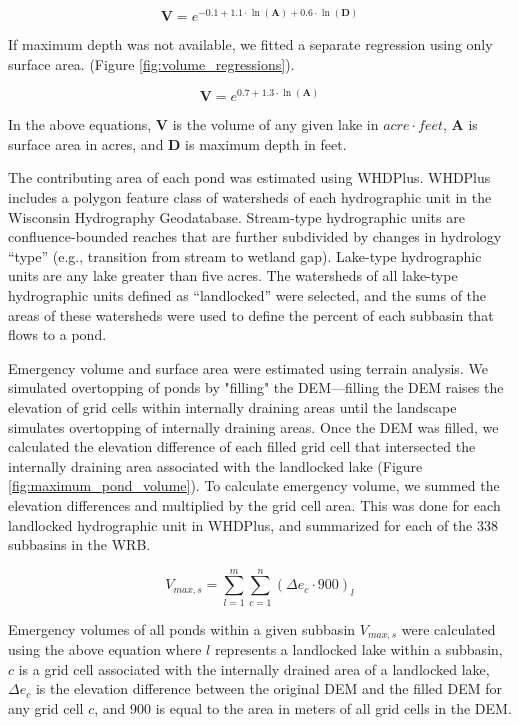 \begin{equation}
\bm{V} = e^{-0.1 + 1.1 \cdot \ln(\bm{A}) + 0.6 \cdot \ln(\bm{D})} 
\end{equation}

If maximum depth was not available, we fitted a separate regression using only surface area. (Figure \ref{fig:volume_regressions}).

\begin{equation}
\bm{V} = e^{0.7 + 1.3 \cdot \ln(\bm{A})} 
\end{equation}

In the above equations, $\bm{V}$ is the volume of any given lake in $acre \cdot feet$, $\bm{A}$ is surface area in acres, and $\bm{D}$ is maximum depth in feet.

The contributing area of each pond was estimated using WHDPlus. WHDPlus includes a polygon feature class of watersheds of each hydrographic unit in the Wisconsin Hydrography Geodatabase. Stream-type hydrographic units are confluence-bounded reaches that are further subdivided by changes in hydrology ``type'' (e.g., transition from stream to wetland gap). Lake-type hydrographic units are any lake greater than five acres. The watersheds of all lake-type hydrographic units defined as ``landlocked'' were selected, and the sums of the areas of these watersheds were used to define the percent of each subbasin that flows to a pond.

Emergency volume and surface area were estimated using terrain analysis. We simulated overtopping of ponds by "filling" the DEM---filling the DEM raises the elevation of grid cells within internally draining areas until the landscape simulates overtopping of internally draining areas. Once the DEM was filled, we calculated the elevation difference of each filled grid cell that intersected the internally draining area associated with the landlocked lake (Figure \ref{fig:maximum_pond_volume}). To calculate emergency volume, we summed the elevation differences and multiplied by the grid cell area. This was done for each landlocked hydrographic unit in WHDPlus, and summarized for each of the 338 subbasins in the WRB.

\begin{equation}
V_{max,s} = \sum\limits_{l=1}^m \sum\limits_{c=1}^n (\Delta e_c \cdot 900)_l
\end{equation}

Emergency volumes of all ponds within a given subbasin $V_{max,s}$ were calculated using the above equation where $l$ represents a landlocked lake within a subbasin, $c$ is a grid cell associated with the internally drained area of a landlocked lake, $\Delta e_c$ is the elevation difference between the original DEM and the filled DEM for any grid cell $c$, and 900 is equal to the area in meters of all grid cells in the DEM.
